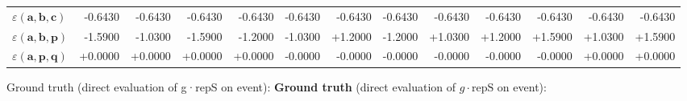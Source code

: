 \documentclass[a4paper,11pt]{article}
\newcommand{\kblbmcpggoncpf}[3]{\varepsilon(\mathbf{#1},\mathbf{#2},\mathbf{#3})}
\begin{document}
\begin{table}[h]
\begin{tabular}{lrrrrrrrrrrrr}
$\kblbmcpggoncpf{a}{b}{c}$ & -0.6430 & -0.6430 & -0.6430 & -0.6430 & -0.6430 & -0.6430 & -0.6430 & -0.6430 & -0.6430 & -0.6430 & -0.6430 & -0.6430 \\
$\kblbmcpggoncpf{a}{b}{p}$ & -1.5900 & -1.0300 & -1.5900 & -1.2000 & -1.0300 & +1.2000 & -1.2000 & +1.0300 & +1.2000 & +1.5900 & +1.0300 & +1.5900 \\
$\kblbmcpggoncpf{a}{p}{q}$ & +0.0000 & +0.0000 & +0.0000 & +0.0000 & -0.0000 & -0.0000 & -0.0000 & -0.0000 & -0.0000 & -0.0000 & +0.0000 & +0.0000 \\
\bottomrule\end{tabular}\end{table}

  Ground truth  (direct evaluation of g·repS on event):
\textbf{Ground truth} (direct evaluation of $g \cdot \text{repS}$ on event):\\
\end{document}
